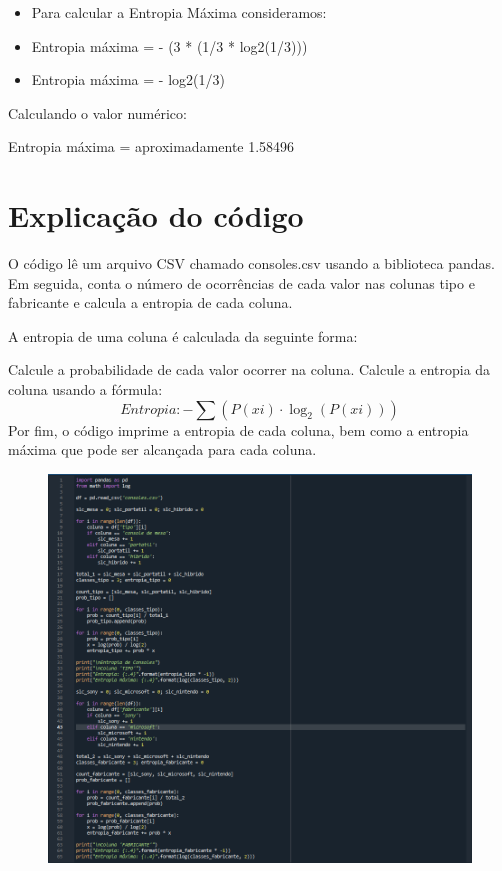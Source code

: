 \begin{itemize}
  \item \hspace{0.5cm} Para calcular a Entropia Máxima consideramos:
  \item \hspace{0.5cm} Entropia máxima = - (3 * (1/3 * log2(1/3)))
  \item \hspace{0.5cm} Entropia máxima = - log2(1/3)
\end{itemize}

Calculando o valor numérico:
\begin{center}
    Entropia máxima = aproximadamente 1.58496
\end{center}

\newpage

\section*{\Large Explicação do código}

O código lê um arquivo CSV chamado consoles.csv usando a biblioteca pandas. Em seguida, conta o número de ocorrências
de cada valor nas colunas tipo e fabricante e calcula a entropia de cada coluna.

A entropia de uma coluna é calculada da seguinte forma:

Calcule a probabilidade de cada valor ocorrer na coluna.
Calcule a entropia da coluna usando a fórmula:
\[
Entropia: - \sum (P(xi) \cdot \log_2(P(xi)))
\]
Por fim, o código imprime a entropia de cada coluna, bem como a entropia máxima que pode ser alcançada para cada coluna.

\begin{figure}[!htpb]
    \centering
    \includegraphics[width=170mm]{code.png}
\end{figure}

